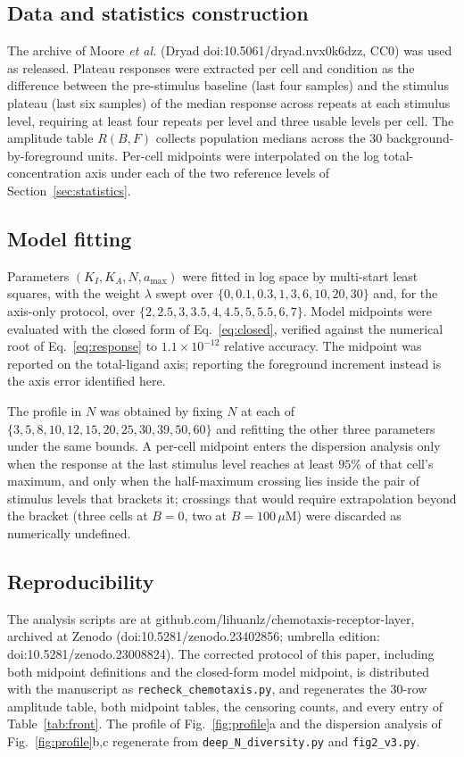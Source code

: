 ﻿\documentclass[11pt,a4paper]{article}
\begin{document}
\subsection{Data and statistics construction}

The archive of Moore \emph{et al.} \cite{Moore2024} (Dryad doi:10.5061/dryad.nvx0k6dzz, CC0) was
used as released. Plateau responses were extracted per cell and condition as the difference between
the pre-stimulus baseline (last four samples) and the stimulus plateau (last six samples) of the
median response across repeats at each stimulus level, requiring at least four repeats per level and
three usable levels per cell. The amplitude table $R(B,F)$ collects population medians across the 30
background-by-foreground units. Per-cell midpoints were interpolated on the log total-concentration
axis under each of the two reference levels of Section~\ref{sec:statistics}.

\subsection{Model fitting}

Parameters $(K_I,K_A,N,a_{\max})$ were fitted in log space by multi-start least squares, with the
weight $\lambda$ swept over $\{0,0.1,0.3,1,3,6,10,20,30\}$ and, for the axis-only protocol, over
$\{2,2.5,3,3.5,4,4.5,5,5.5,6,7\}$. Model midpoints were evaluated with the closed form of
Eq.~\eqref{eq:closed}, verified against the numerical root of Eq.~\eqref{eq:response} to
$1.1\times10^{-12}$ relative accuracy. The midpoint was reported on the total-ligand axis; reporting
the foreground increment instead is the axis error identified here.

The profile in $N$ was obtained by fixing $N$ at each of
$\{3,5,8,10,12,15,20,25,30,39,50,60\}$ and refitting the other three parameters under the same
bounds. A per-cell midpoint enters the dispersion analysis only when the response at the last
stimulus level reaches at least $95\%$ of that cell's maximum, and only when the half-maximum
crossing lies inside the pair of stimulus levels that brackets it; crossings that would require
extrapolation beyond the bracket (three cells at $B=0$, two at $B=100\,\mu$M) were discarded as
numerically undefined.

\subsection{Reproducibility}

The analysis scripts are at github.com/lihuanlz/chemotaxis-receptor-layer, archived at Zenodo
(doi:10.5281/zenodo.23402856; umbrella edition: doi:10.5281/zenodo.23008824). The corrected protocol
of this paper, including both midpoint definitions and the closed-form model midpoint, is distributed
with the manuscript as \texttt{recheck\_chemotaxis.py}, and regenerates the 30-row amplitude table,
both midpoint tables, the censoring counts, and every entry of Table~\ref{tab:front}. The profile of
Fig.~\ref{fig:profile}a and the dispersion analysis of Fig.~\ref{fig:profile}b,c regenerate from
\texttt{deep\_N\_diversity.py} and \texttt{fig2\_v3.py}.
\end{document}
